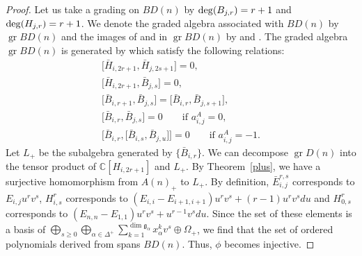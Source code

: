 \documentclass[pdftex]{sigma}
\numberwithin{equation}{section}
\theoremstyle{definition}
\begin{document}
\begin{proof}
Let us take a grading on $BD(n)$ by ${\rm deg}(B_{j,r})=r+1$ and ${\rm deg}(H_{j,r})=r+1$. We denote the graded algebra associated with $BD(n)$ by $\operatorname{gr}BD(n)$ and the images of  and  in $\operatorname{gr}BD(n)$ by  and . The graded algebra $\operatorname{gr}BD(n)$ is generated by  which satisfy the following relations:
\begin{gather*}
\bigl[\bar{H}_{i,2r+1},\bar{H}_{j,2s+1}\bigr]=0,\\
\bigl[\bar{H}_{i,2r+1},\bar{B}_{j,s}\bigr]=0,\\
\bigl[\bar{B}_{i,r+1},\bar{B}_{j,s}\bigr]=\bigl[\bar{B}_{i,r},\bar{B}_{j,s+1}\bigr],\\
\bigl[\bar{B}_{i,r},\bar{B}_{j,s}\bigr]=0\qquad \text{if }a^A_{i,j}=0,\\
\bigl[\bar{B}_{i,r},\bigl[\bar{B}_{i,s},\bar{B}_{j,u}\bigr]\bigr]=0\qquad \text{if }a^A_{i,j}=-1.
\end{gather*}
Let $L_+$ be the subalgebra generated by $\bigl\{\bar{B}_{i,r}\bigr\}$.
We can decompose $\operatorname{gr}D(n)$ into the tensor product of $\mathbb{C}[H_{i,2r+1}]$ and $L_+$. By Theorem~\ref{plus}, we have a surjective homomorphism from $A(n)_+$ to $L_+$.
By definition, $\bar{E}^{r,s}_{i,j}$ corresponds to $E_{i,j}u^rv^s$, $H^r_{i,s}$ corresponds to $(E_{i,i}-E_{i+1,i+1})u^rv^s+\allowbreak {(r-1)u^rv^sdu}$ and $H^r_{0,s}$ corresponds to $(E_{n,n}-E_{1,1})u^rv^s+u^{r-1}v^sdu$. Since the set of these elements is a basis of $\bigoplus_{s\geq0}\bigoplus_{\alpha\in\Delta^+}\sum_{k=1}^{\dim \mathfrak{g}_\alpha}x_\alpha^k v^s\oplus\Omega_+$, we find that the set of ordered polynomials derived from  spans $BD(n)$. Thus, $\phi$ becomes injective.
\end{proof}
\end{document}
